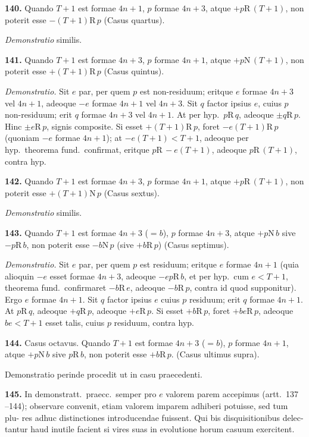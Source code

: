 \documentclass[12pt,a4paper]{article}
\newcommand{\R}{\mbox{R}}
\newcommand{\N}{\mbox{N}}
\begin{document}
\textbf{140.}
Quando $T+1$ est formae $4n+1$, $p$ formae $4n+3$, atque $+p \R\, (T+1)$,
non poterit esse $-(T+1) \R\, p$ (Casus quartus).

\textit{Demonstratio} similis.

\textbf{141.}
Quando $T+1$ est formae $4n+3$, $p$ formae $4n+1$, atque $+p \N\, (T+1)$,
non poterit esse $+(T+1) \R\, p$ (Casus quintus).

\textit{Demonstratio.} Sit $e$ par, per quem $p$ est non-residuum; eritque $e$ formae
$4n+3$ vel $4n+1$, adeoque $-e$ formae $4n+1$ vel $4n+3$. Sit $q$ factor
ipsius $e$, cuius $p$ non-residuum; erit $q$ formae $4n+3$ vel $4n+1$. At per
hyp.\ $p \R\, q$, adeoque $\pm q \R\, p$. Hinc $\pm e \R\, p$, signis composite.
Si esset $+(T+1) \R\, p$, foret $-e(T+1) \R\, p$ (quoniam $-e$ formae $4n+1$);
at $-e(T+1) < T+1$, adeoque per hyp.\ theorema fund.\ confirmat, eritque
$p \R\, -e(T+1)$, adeoque $p \R\, (T+1)$, contra hyp.

\textbf{142.}
Quando $T+1$ est formae $4n+3$, $p$ formae $4n+1$, atque $+p \R\, (T+1)$,
non poterit esse $+(T+1) \N\, p$ (Casus sextus).

\textit{Demonstratio} similis.

\textbf{143.}
Quando $T+1$ est formae $4n+3$ ($= b$), $p$ formae $4n+3$, atque
$+p \N\, b$ sive $-p \R\, b$, non poterit esse $-b \N\, p$ (sive $+b \R\, p$)
(Casus septimus).

\textit{Demonstratio.} Sit $e$ par, per quem $p$ est residuum; eritque $e$ formae
$4n+1$ (quia alioquin $-e$ esset formae $4n+3$, adeoque $-ep \R\, b$, et per
hyp.\ cum $e < T+1$, theorema fund.\ confirmaret $-b \R\, e$, adeoque $-b \R\, p$,
contra id quod supponitur). Ergo $e$ formae $4n+1$. Sit $q$ factor ipsius $e$
cuius $p$ residuum; erit $q$ formae $4n+1$. At $p \R\, q$, adeoque $+q \R\, p$,
adeoque $+e \R\, p$. Si esset $+b \R\, p$, foret $+be \R\, p$, adeoque $be < T+1$
esset talis, cuius $p$ residuum, contra hyp.

\textbf{144.}
Casus octavus. Quando $T+1$ est formae $4n+3$ ($= b$), $p$ formae $4n+1$,
atque $+p \N\, b$ sive $p \R\, b$, non poterit esse $+b \R\, p$. (Casus ultimus supra).

Demonstratio perinde procedit ut in casu praecedenti.

\textbf{145.}
In demonstratt.\ praecc.\ semper pro $e$ valorem parem accepimus (artt.~137
--144); observare convenit, etiam valorem imparem adhiberi potuisse, sed tum plu-
res adhuc distinctiones introducendae fuissent. Qui bis disquisitionibus delec-
tantur haud inutile facient si vires suas in evolutione horum casuum exercitent.
\end{document}
